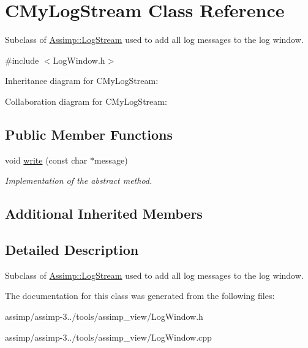 \hypertarget{class_c_my_log_stream}{\section{C\+My\+Log\+Stream Class Reference}
\label{class_c_my_log_stream}
}


Subclass of \hyperlink{class_assimp_1_1_log_stream}{Assimp\+::\+Log\+Stream} used to add all log messages to the log window.  




{\ttfamily \#include $<$Log\+Window.\+h$>$}



Inheritance diagram for C\+My\+Log\+Stream\+:


Collaboration diagram for C\+My\+Log\+Stream\+:
\subsection*{Public Member Functions}
\begin{DoxyCompactItemize}
\item 
\hypertarget{class_c_my_log_stream_a62f392bab1c11ccb46d12fc3c7b74b8e}{void \hyperlink{class_c_my_log_stream_a62f392bab1c11ccb46d12fc3c7b74b8e}{write} (const char $\ast$message)}\label{class_c_my_log_stream_a62f392bab1c11ccb46d12fc3c7b74b8e}

\begin{DoxyCompactList}\small\item\em Implementation of the abstract method. \end{DoxyCompactList}\end{DoxyCompactItemize}
\subsection*{Additional Inherited Members}


\subsection{Detailed Description}
Subclass of \hyperlink{class_assimp_1_1_log_stream}{Assimp\+::\+Log\+Stream} used to add all log messages to the log window. 

The documentation for this class was generated from the following files\+:\begin{DoxyCompactItemize}
\item 
assimp/assimp-\/3../tools/assimp\+\_\+view/Log\+Window.\+h\item 
assimp/assimp-\/3../tools/assimp\+\_\+view/Log\+Window.\+cpp\end{DoxyCompactItemize}
